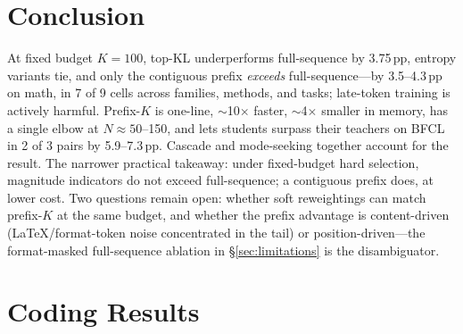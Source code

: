 \documentclass[10pt]{article}
\begin{document}
\section{Conclusion}
\label{sec:conclusion}

At fixed budget $K{=}100$, top-KL underperforms full-sequence by 3.75\,pp, entropy variants tie, and only the contiguous prefix \emph{exceeds} full-sequence---by 3.5--4.3\,pp on math, in 7 of 9 cells across families, methods, and tasks; late-token training is actively harmful. Prefix-$K$ is one-line, $\sim$10$\times$ faster, $\sim$4$\times$ smaller in memory, has a single elbow at $N\approx 50$--150, and lets students surpass their teachers on BFCL in 2 of 3 pairs by 5.9--7.3\,pp. Cascade and mode-seeking together account for the result. The narrower practical takeaway: under fixed-budget hard selection, magnitude indicators do not exceed full-sequence; a contiguous prefix does, at lower cost. Two questions remain open: whether soft reweightings can match prefix-$K$ at the same budget, and whether the prefix advantage is content-driven (LaTeX/format-token noise concentrated in the tail) or position-driven---the format-masked full-sequence ablation in \S\ref{sec:limitations} is the disambiguator.






\appendix

\section{Coding Results}
\label{app:coding}
\end{document}
